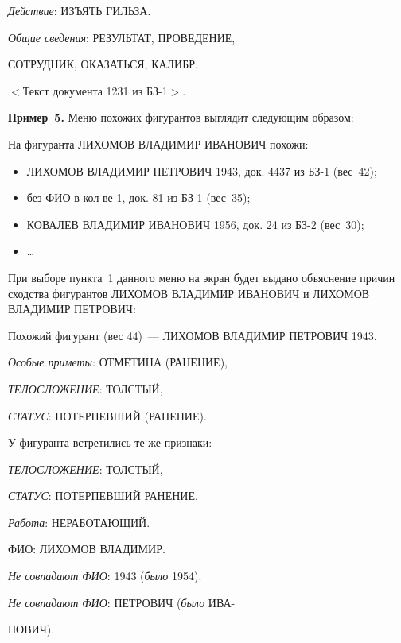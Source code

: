 \begin{multicols}{2}
     \textit{Действие}: ИЗЪЯТЬ ГИЛЬЗА.
     
     \textit{Общие сведения}: РЕЗУЛЬТАТ, ПРОВЕДЕНИЕ, 
     
     СОТРУДНИК, ОКАЗАТЬСЯ, КАЛИБР.
     
\noindent
     $<$Текст документа 1231 из БЗ-1$>$.
     
     \medskip
     
     \noindent
     \textbf{Пример~5.} Меню похожих фигурантов выглядит следующим 
образом:
    
     На фигуранта ЛИХОМОВ ВЛАДИМИР ИВАНОВИЧ похожи:
     \begin{itemize}
     \item ЛИХОМОВ ВЛАДИМИР ПЕТРОВИЧ 1943, док. 4437 из БЗ-1 (вес~42);
     \item без ФИО в кол-ве 1, док. 81 из БЗ-1 (вес~35);
     \item КОВАЛЕВ ВЛАДИМИР ИВАНОВИЧ 1956, док. 24 из БЗ-2 (вес~30);
     \item \ldots
     \end{itemize}
     
    При выборе пункта~1 данного меню на экран будет выдано объяснение 
причин сходства фигурантов ЛИХОМОВ ВЛАДИМИР ИВАНОВИЧ и 
ЛИХОМОВ ВЛАДИМИР ПЕТРОВИЧ:

     \smallskip
    
\noindent
     Похожий фигурант (вес 44)~--- ЛИХОМОВ ВЛАДИМИР ПЕТРОВИЧ 1943.
     
     \textit{Особые приметы}: ОТМЕТИНА (РАНЕНИЕ),
     
     \textit{ТЕЛОСЛОЖЕНИЕ}: ТОЛСТЫЙ,
     
     \textit{СТАТУС}: ПОТЕРПЕВШИЙ (РАНЕНИЕ).
     
          \smallskip
     
\noindent
     У фигуранта встретились те же признаки:
     
     \smallskip
     
     \textit{ТЕЛОСЛОЖЕНИЕ}: ТОЛСТЫЙ,
     
     \textit{СТАТУС}: ПОТЕРПЕВШИЙ РАНЕНИЕ,
     
     \textit{Работа}: НЕРАБОТАЮЩИЙ.
     
     ФИО: ЛИХОМОВ ВЛАДИМИР.
     
     \textit{Не совпадают ФИО}: 1943 (\textit{было} 1954).
     
     \textit{Не совпадают ФИО}: ПЕТРОВИЧ (\textit{было} ИВА-
     
     НОВИЧ).
     

\end{multicols}
